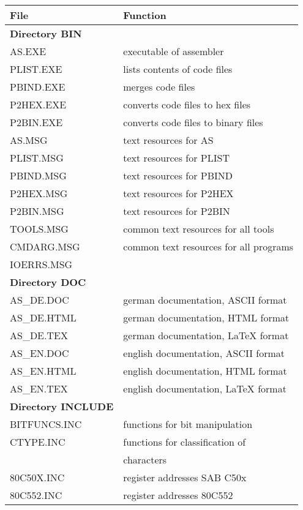 \documentclass[12pt,twoside]{report}
\begin{document}
\begin{center}\begin{longtable}{|l|l|}
\hline
File              & Function \\
\hline
\hline
\endhead
{\bf Directory BIN} & \\
\hline
AS.EXE            & executable of assembler \\
PLIST.EXE         & lists contents of code files \\
PBIND.EXE         & merges code files \\
P2HEX.EXE         & converts code files to hex files \\
P2BIN.EXE         & converts code files to binary files \\
AS.MSG            & text resources for AS \\
PLIST.MSG         & text resources for PLIST \\
PBIND.MSG         & text resources for PBIND \\
P2HEX.MSG         & text resources for P2HEX \\
P2BIN.MSG         & text resources for P2BIN \\
TOOLS.MSG         & common text resources for all tools \\
CMDARG.MSG        & common text resources for all programs \\
IOERRS.MSG        & \\
\hline
{\bf Directory DOC} & \\
\hline
AS\_DE.DOC        & german documentation, ASCII format \\
AS\_DE.HTML       & german documentation, HTML format \\
AS\_DE.TEX        & german documentation, LaTeX format \\
AS\_EN.DOC        & english documentation, ASCII format \\
AS\_EN.HTML       & english documentation, HTML format \\
AS\_EN.TEX        & english documentation, LaTeX format \\
\hline
{\bf Directory INCLUDE} & \\
\hline
BITFUNCS.INC      & functions for bit manipulation \\
CTYPE.INC         & functions for classification of \\
                  & characters \\
80C50X.INC        & register addresses SAB C50x \\
80C552.INC        & register addresses 80C552 \\

\end{longtable}
\end{center}
\end{document}
